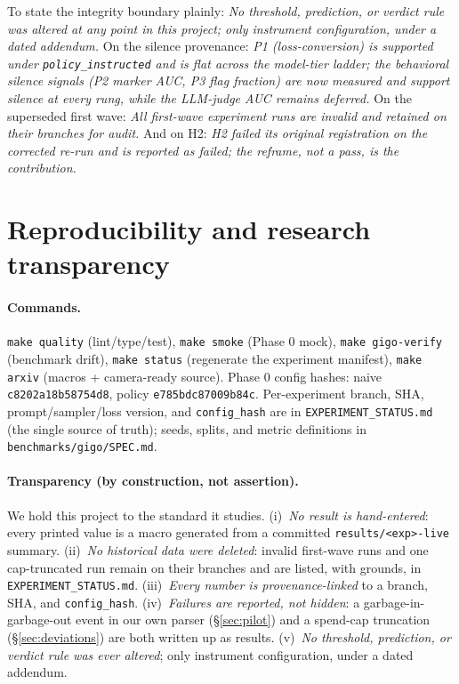 \documentclass[11pt]{article}
\theoremstyle{plain}
\theoremstyle{definition}
\begin{document}
To state the integrity boundary plainly: \emph{No threshold, prediction, or verdict
rule was altered at any point in this project; only instrument configuration, under a
dated addendum.} On the silence provenance: \emph{P1 (loss-conversion) is supported under
\texttt{policy\_instructed} and is flat across the model-tier ladder; the behavioral
silence signals (P2 marker AUC, P3 flag fraction) are now measured and support silence at
every rung, while the LLM-judge AUC remains deferred.} On the superseded first wave:
\emph{All first-wave experiment runs are invalid and retained on their branches for audit.}
And on H2: \emph{H2 failed its original registration on the corrected re-run and is reported
as failed; the reframe, not a pass, is the contribution.}

\section{Reproducibility and research transparency}\label{sec:repro}
\paragraph{Commands.} \texttt{make quality} (lint/type/test), \texttt{make smoke}
(Phase 0 mock), \texttt{make gigo-verify} (benchmark drift), \texttt{make status}
(regenerate the experiment manifest), \texttt{make arxiv} (macros + camera-ready source).
Phase 0 config hashes: naive \texttt{c8202a18b58754d8}, policy \texttt{e785bdc87009b84c}.
Per-experiment branch, SHA, prompt/sampler/loss version, and \texttt{config\_hash} are in
\texttt{EXPERIMENT\_STATUS.md} (the single source of truth); seeds, splits, and metric
definitions in \texttt{benchmarks/gigo/SPEC.md}.
\paragraph{Transparency (by construction, not assertion).} We hold this project to the
standard it studies. (i)~\emph{No result is hand-entered}: every printed value is a macro
generated from a committed \texttt{results/<exp>-live} summary. (ii)~\emph{No historical
data were deleted}: invalid first-wave runs and one cap-truncated run remain on their
branches and are listed, with grounds, in \texttt{EXPERIMENT\_STATUS.md}. (iii)~\emph{Every
number is provenance-linked} to a branch, SHA, and \texttt{config\_hash}. (iv)~\emph{Failures
are reported, not hidden}: a garbage-in-garbage-out event in our own parser (\S\ref{sec:pilot})
and a spend-cap truncation (\S\ref{sec:deviations}) are both written up as results.
(v)~\emph{No threshold, prediction, or verdict rule was ever altered}; only instrument
configuration, under a dated addendum.
\end{document}
